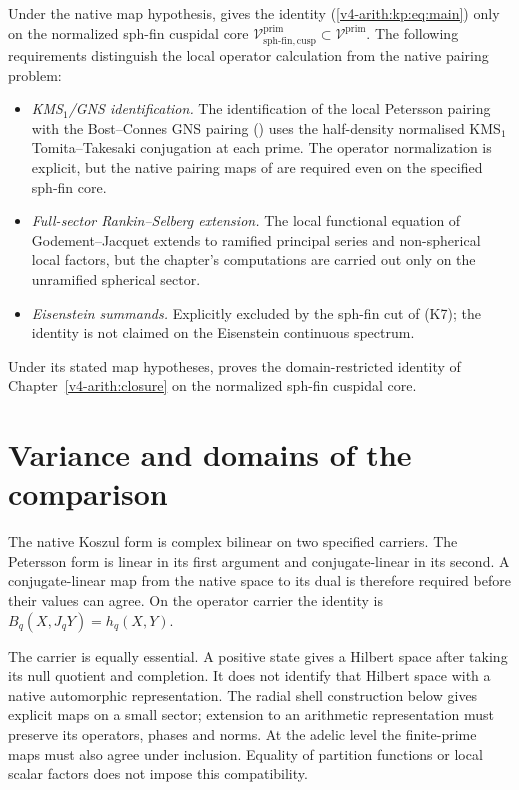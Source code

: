 \begin{remark}
\label{v4-arith:kp:rem:domain-restriction}
Under the native map hypothesis,  gives the identity
(\ref{v4-arith:kp:eq:main}) only on the normalized sph-fin
cuspidal core
\(\mathcal{V}^{\mathrm{prim}}_{\mathrm{sph\text{-}fin,cusp}}\subset\mathcal{V}^{\mathrm{prim}}\).
The following requirements distinguish the local operator calculation
from the native pairing problem:
\begin{itemize}
\item \emph{KMS\(_{1}\)/GNS identification.} The identification of the
local Petersson pairing with the Bost--Connes GNS pairing
() uses the
half-density normalised KMS\(_{1}\) Tomita--Takesaki conjugation at
each prime. The operator normalization is explicit, but the native
pairing maps of 
are required even on the specified sph-fin core.
\item \emph{Full-sector Rankin--Selberg extension.} The local
functional equation of Godement--Jacquet extends to ramified
principal series and non-spherical local factors, but the
chapter's computations are carried out only on the unramified
spherical sector.
\item \emph{Eisenstein summands.} Explicitly excluded by the sph-fin
cut of (K7); the identity is not
claimed on the Eisenstein continuous spectrum.
\end{itemize}
Under its stated map hypotheses,  proves the domain-restricted identity
 of
Chapter~\ref{v4-arith:closure} on the normalized sph-fin cuspidal
core.
\end{remark}

\section{Variance and domains of the comparison}
\label{v4-arith:kp:obstruction-analysis-table}
The native Koszul form is complex bilinear on two specified carriers.
The Petersson form is linear in its first argument and conjugate-linear
in its second. A conjugate-linear map from the native space to its dual
is therefore required before their values can agree. On the operator
carrier the identity is \(B_q(X,J_qY)=h_q(X,Y)\).

The carrier is equally essential. A positive state gives a Hilbert
space after taking its null quotient and completion. It does not
identify that Hilbert space with a native automorphic representation.
The radial shell construction below gives explicit maps on a small
sector; extension to an arithmetic representation must preserve its
operators, phases and norms. At the adelic level the finite-prime maps
must also agree under inclusion. Equality of partition functions or
local scalar factors does not impose this compatibility.

